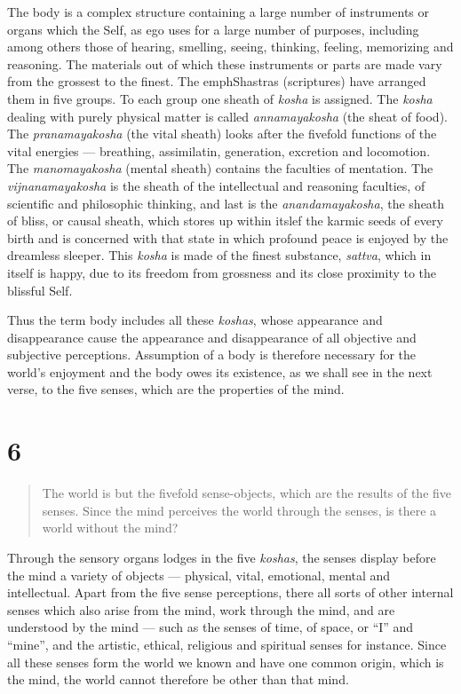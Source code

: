 \documentclass[12pt]{report}
\begin{document}
The body is a complex structure containing a large number of
instruments or organs which the Self, as ego uses for a large number
of purposes, including among others those of hearing, smelling,
seeing, thinking, feeling, memorizing and reasoning. The materials out
of which these instruments or parts are made vary from the grossest to
the finest. The emph{Shastras} (scriptures) have arranged them in five
groups. To each group one sheath of \emph{kosha} is assigned. The
\emph{kosha} dealing with purely physical matter is called
\emph{annamayakosha} (the sheat of food). The \emph{pranamayakosha}
(the vital sheath) looks after the fivefold functions of the vital
energies --- breathing, assimilatin, generation, excretion and
locomotion. The \emph{manomayakosha} (mental sheath) contains the
faculties of mentation. The \emph{vijnanamayakosha} is the sheath of
the intellectual and reasoning faculties, of scientific and
philosophic thinking, and last is the \emph{anandamayakosha}, the
sheath of bliss, or causal sheath, which stores up within itslef the
karmic seeds of every birth and is concerned with that state in which
profound peace is enjoyed by the dreamless sleeper. This \emph{kosha}
is made of the finest substance, \emph{sattva}, which in itself is
happy, due to its freedom from grossness and its close proximity to
the blissful Self.

Thus the term body includes all these \emph{koshas}, whose appearance
and disappearance cause the appearance and disappearance of all
objective and subjective perceptions. Assumption of a body is
therefore necessary for the world's enjoyment and the body owes its
existence, as we shall see in the next verse, to the five senses,
which are the properties of the mind.

\section*{6}

\begin{quote}
The world is but the fivefold sense-objects, which are the results of
the five senses. Since the mind perceives the world through the
senses, is there a world without the mind?
\end{quote}


Through the sensory organs lodges in the five \emph{koshas}, the
senses display before the mind a variety of objects --- physical,
vital, emotional, mental and intellectual. Apart from the five sense
perceptions, there all sorts of other internal senses which also arise
from the mind, work through the mind, and are understood by the mind
--- such as the senses of time, of space, or ``I'' and ``mine'', and
the artistic, ethical, religious and spiritual senses for
instance. Since all these senses form the world we known and have one 
common origin, which is the mind, the world cannot therefore be other
than that mind.
\end{document}
